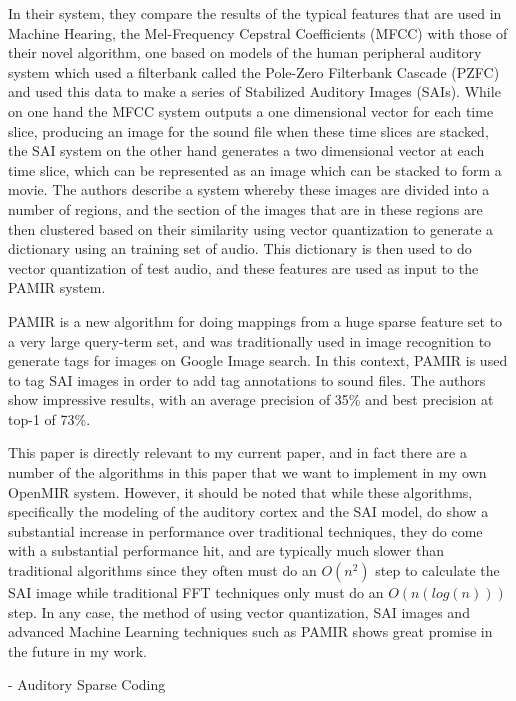 In their system, they compare the results of the typical features that
are used in Machine Hearing, the Mel-Frequency Cepstral Coefficients
\cite{Logan00melfrequency} (MFCC) with those of their novel algorithm,
one based on models of the human peripheral auditory system which used
a filterbank called the Pole-Zero Filterbank Cascade (PZFC) and used
this data to make a series of Stabilized Auditory Images (SAIs).
While on one hand the MFCC system outputs a one dimensional vector for
each time slice, producing an image for the sound file when these time
slices are stacked, the SAI system on the other hand generates a two
dimensional vector at each time slice, which can be represented as an
image which can be stacked to form a movie.  The authors describe a
system whereby these images are divided into a number of regions, and
the section of the images that are in these regions are then clustered
based on their similarity using vector quantization to generate a
dictionary using an training set of audio.  This dictionary is then
used to do vector quantization of test audio, and these features are
used as input to the PAMIR system.

PAMIR is a new algorithm for doing mappings from a huge sparse feature
set to a very large query-term set, and was traditionally used in
image recognition \cite{chechik10} to generate tags for images on
Google Image search.  In this context, PAMIR is used to tag SAI images
in order to add tag annotations to sound files.  The authors show
impressive results, with an average precision of 35\% and best
precision at top-1 of 73\%.

This paper is directly relevant to my current paper, and in fact there
are a number of the algorithms in this paper that we want to implement
in my own OpenMIR system.  However, it should be noted that while
these algorithms, specifically the modeling of the auditory cortex and
the SAI model, do show a substantial increase in performance over
traditional techniques, they do come with a substantial performance
hit, and are typically much slower than traditional algorithms since
they often must do an $O(n^2)$ step to calculate the SAI image while
traditional FFT techniques only must do an $O(n(log(n)))$ step.  In
any case, the method of using vector quantization, SAI images and
advanced Machine Learning techniques such as PAMIR shows great promise
in the future in my work.

- Auditory Sparse Coding

